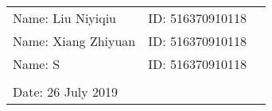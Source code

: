 \documentclass[12pt,a4paper]{article}
\begin{document}
\vspace*{0.25cm}

\hrulefill

\thispagestyle{empty}

\begin{center}
\begin{large}
\end{large}

\hrulefill

\vspace*{5cm}
\begin{Large}
\end{Large}

\vspace{2em}

\begin{large}
\end{large}
\end{center}


\vfill

\begin{table}[h!]
\flushleft
\begin{tabular}{lll}
Name: Liu Niyiqiu \hspace*{2em}&
ID: 516370910118\hspace*{2em}
\\
Name: Xiang Zhiyuan \hspace*{2em}&
ID: 516370910118\hspace*{2em}
\\
Name: S \hspace*{2em}&
ID: 516370910118\hspace*{2em}
\\


\\

Date: 26 July 2019
\end{tabular}
\end{table}

\hfill

\newpage
\tableofcontents
\newpage
\end{document}
